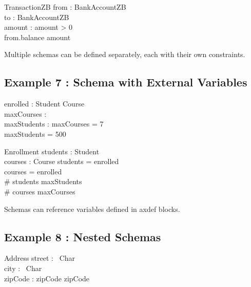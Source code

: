 \documentclass[a4paper,10pt,fleqn]{article}
\begin{document}
\begin{schema}{TransactionZB}
from : BankAccountZB \\
to : BankAccountZB \\
amount : \nat
\where
amount > 0 \\
from.balance \geq amount
\end{schema}

\noindent Multiple schemas can be defined separately, each with their own constraints.

\bigskip

\subsection*{Example 7 : Schema with External Variables}

\begin{zed}
\end{zed}

\begin{axdef}
enrolled : Student \rel Course \\
maxCourses : \nat \\
maxStudents : \nat
\where
maxCourses = 7 \\
maxStudents = 500
\end{axdef}

\begin{schema}{Enrollment}
students : \finset Student \\
courses : \finset Course
\where
students = \dom enrolled \\
courses = \ran enrolled \\
\# students \leq maxStudents \\
\# courses \leq maxCourses
\end{schema}

\noindent Schemas can reference variables defined in axdef blocks.

\bigskip

\subsection*{Example 8 : Nested Schemas}

\begin{zed}
[Char]
\end{zed}

\begin{schema}{Address}
street : \seq~Char \\
city : \seq~Char \\
zipCode : \nat
\where
zipCode  \land zipCode 
\end{schema}
\end{document}
